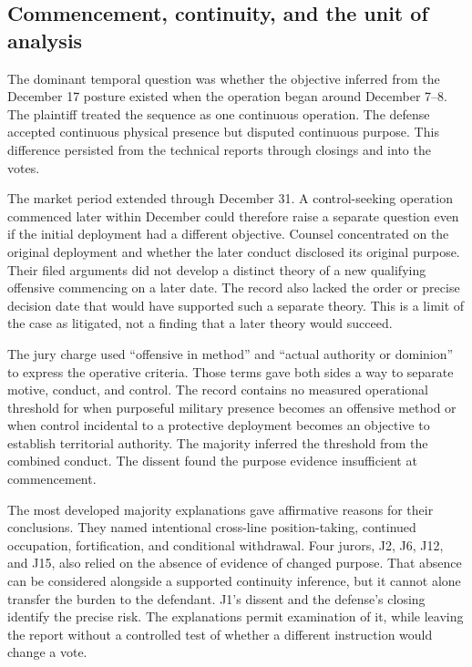 \subsection{Commencement, continuity, and the unit of analysis}

The dominant temporal question was whether the objective inferred from the December 17 posture existed when the operation began around December 7--8.  The plaintiff treated the sequence as one continuous operation.  The defense accepted continuous physical presence but disputed continuous purpose.  This difference persisted from the technical reports through closings and into the votes.

The market period extended through December 31.  A control-seeking operation commenced later within December could therefore raise a separate question even if the initial deployment had a different objective.  Counsel concentrated on the original deployment and whether the later conduct disclosed its original purpose.  Their filed arguments did not develop a distinct theory of a new qualifying offensive commencing on a later date.  The record also lacked the order or precise decision date that would have supported such a separate theory.  This is a limit of the case as litigated, not a finding that a later theory would succeed.

The jury charge used “offensive in method” and “actual authority or dominion” to express the operative criteria.  Those terms gave both sides a way to separate motive, conduct, and control.  The record contains no measured operational threshold for when purposeful military presence becomes an offensive method or when control incidental to a protective deployment becomes an objective to establish territorial authority.  The majority inferred the threshold from the combined conduct.  The dissent found the purpose evidence insufficient at commencement.

The most developed majority explanations gave affirmative reasons for their conclusions.  They named intentional cross-line position-taking, continued occupation, fortification, and conditional withdrawal.  Four jurors, J2, J6, J12, and J15, also relied on the absence of evidence of changed purpose.  That absence can be considered alongside a supported continuity inference, but it cannot alone transfer the burden to the defendant.  J1's dissent and the defense's closing identify the precise risk.  The explanations permit examination of it, while leaving the report without a controlled test of whether a different instruction would change a vote.

